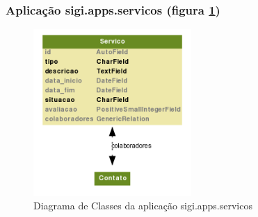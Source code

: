 \subsubsection{Aplicação sigi.apps.servicos (figura \ref{fig:servicos})}
\begin{figure}[h]
  \centering
  \includegraphics[width=60mm]{../imagens/servicos.png}
  \caption{Diagrama de Classes da aplicação sigi.apps.servicos}
  \label{fig:servicos}
\end{figure}

%
%
